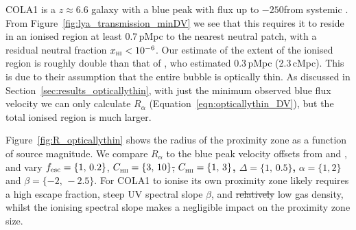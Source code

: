 \documentclass[fleqn,usenatbib]{mnras}
\providecommand{\DIFadd}[1]{{\protect\color{Green} \bf #1}} %
\providecommand{\DIFdel}[1]{{\protect\color{lightgray} \footnotesize \sout{#1}}} %
\providecommand{\DIFaddbegin}{} %
\providecommand{\DIFaddend}{} %
\providecommand{\DIFdelbegin}{} %
\providecommand{\DIFdelend}{} %
\newcommand{\DIFscaledelfig}{0.5}
\newlength{\DIFdelgraphicswidth} %
\newlength{\DIFdelgraphicsheight} %
\newcommand{\DIFaddincludegraphics}[2][]{{\color{blue}\fbox{\DIFOincludegraphics[#1]{#2}}}} %
\newcommand{\DIFdelincludegraphics}[2][]{%
\sbox{\DIFdelgraphicsbox}{\DIFOincludegraphics[#1]{#2}}%
\settoboxwidth{\DIFdelgraphicswidth}{\DIFdelgraphicsbox} %
\settoboxtotalheight{\DIFdelgraphicsheight}{\DIFdelgraphicsbox} %
\scalebox{\DIFscaledelfig}{%
\parbox[b]{\DIFdelgraphicswidth}{\usebox{\DIFdelgraphicsbox}\\[-\baselineskip] \rule{\DIFdelgraphicswidth}{0em}}\llap{\resizebox{\DIFdelgraphicswidth}{\DIFdelgraphicsheight}{%
\setlength{\unitlength}{\DIFdelgraphicswidth}%
\begin{picture}(1,1)%
\thicklines\linethickness{2pt} %
{\color[rgb]{1,0,0}\put(0,0){\framebox(1,1){}}}%
{\color[rgb]{1,0,0}\put(0,0){\line( 1,1){1}}}%
{\color[rgb]{1,0,0}\put(0,1){\line(1,-1){1}}}%
\end{picture}%
}\hspace*{3pt}}} %
} %
\DeclareRobustCommand{\DIFaddbegin}{\DIFOaddbegin \let\includegraphics\DIFaddincludegraphics} %
\DeclareRobustCommand{\DIFaddend}{\DIFOaddend \let\includegraphics\DIFOincludegraphics} %
\DeclareRobustCommand{\DIFdelbegin}{\DIFOdelbegin \let\includegraphics\DIFdelincludegraphics} %
\DeclareRobustCommand{\DIFdelend}{\DIFOaddend \let\includegraphics\DIFOincludegraphics} %
\begin{document}
COLA1 is a $z \approx 6.6$ galaxy with a blue \lya peak with flux up to $-250$\kms from systemic \citep{Hu2016,Matthee2018b}. From Figure~\ref{fig:lya_transmission_minDV} we see that this requires it to reside in an ionised region at least $0.7$\,pMpc to the nearest neutral patch, with a residual neutral fraction $\xHI < 10^{-6}$. Our estimate of the extent of the ionised region is roughly double than that of \citet{Matthee2018b}, who estimated 0.3\,pMpc (2.3\,cMpc). This is due to their assumption that the entire bubble is optically thin. As discussed in Section~\ref{sec:results_opticallythin}, with just the minimum observed blue flux velocity we can only calculate $R_\alpha$ (Equation~\ref{eqn:opticallythin_DV}), but the total ionised region is much larger.

Figure~\ref{fig:R_opticallythin} shows the radius of the proximity zone as a function of source magnitude. We compare $R_\alpha$ to the blue peak velocity offsets from \citet{Matthee2018b} and \citet{Hashimoto2018a}, and vary $\fesc =\{1,\,0.2\}$, \DIFdelbegin \DIFdel{$\clump =\{3,\,10\}$, }\DIFdelend \DIFaddbegin \DIFadd{$\clump =\{1,\,3\}$, $\Delta =\{1,\,0.5\}$, }\DIFaddend $\alpha =\{1,2\}$ and $\beta = \{-2,\,-2.5\}$. For COLA1 to ionise its own proximity zone likely requires a high escape fraction, steep UV spectral slope $\beta$, and \DIFdelbegin \DIFdel{relatively }\DIFdelend low gas density, whilst the ionising spectral slope makes a negligible impact on the proximity zone size.
\end{document}
